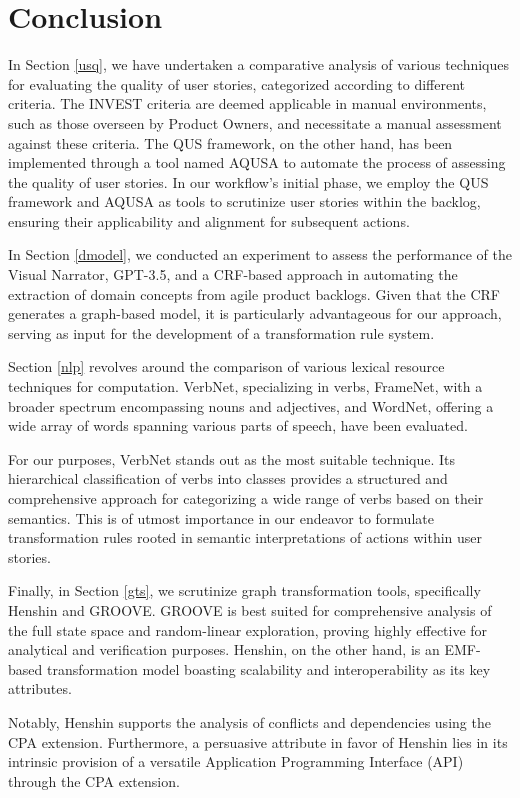\section{Conclusion}\label{conclusion}
In Section \ref{usq}, we have undertaken a comparative analysis of various techniques for evaluating the quality of user stories, categorized according to different criteria. The INVEST criteria are deemed applicable in manual environments, such as those overseen by Product Owners, and necessitate a manual assessment against these criteria. The QUS framework, on the other hand, has been implemented through a tool named AQUSA to automate the process of assessing the quality of user stories. In our workflow's initial phase, we employ the QUS framework and AQUSA as tools to scrutinize user stories within the backlog, ensuring their applicability and alignment for subsequent actions.

In Section \ref{dmodel}, we conducted an experiment to assess the performance of the Visual Narrator, GPT-3.5, and a CRF-based approach in automating the extraction of domain concepts from agile product backlogs. Given that the CRF generates a graph-based model, it is particularly advantageous for our approach, serving as input for the development of a transformation rule system.

Section \ref{nlp} revolves around the comparison of various lexical resource techniques for computation. VerbNet, specializing in verbs, FrameNet, with a broader spectrum encompassing nouns and adjectives, and WordNet, offering a wide array of words spanning various parts of speech, have been evaluated. 

For our purposes, VerbNet stands out as the most suitable technique. Its hierarchical classification of verbs into classes provides a structured and comprehensive approach for categorizing a wide range of verbs based on their semantics. This is of utmost importance in our endeavor to formulate transformation rules rooted in semantic interpretations of actions within user stories.

Finally, in Section \ref{gts}, we scrutinize graph transformation tools, specifically Henshin and GROOVE. GROOVE is best suited for comprehensive analysis of the full state space and random-linear exploration, proving highly effective for analytical and verification purposes. Henshin, on the other hand, is an EMF-based transformation model boasting scalability and interoperability as its key attributes. 

Notably, Henshin supports the analysis of conflicts and dependencies using the CPA extension. Furthermore, a persuasive attribute in favor of Henshin lies in its intrinsic provision of a versatile Application Programming Interface (API) through the CPA extension.

